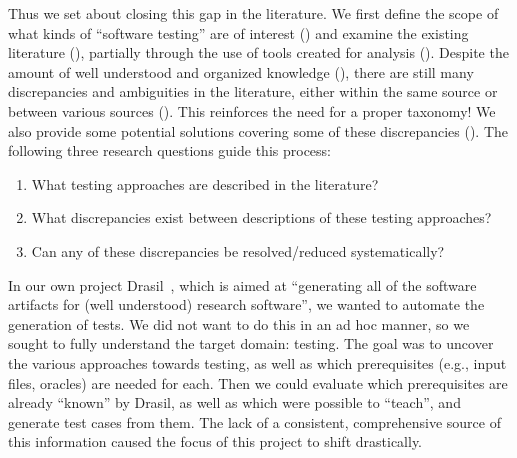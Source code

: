 Thus we set about closing this gap in the literature. We first define the scope
of what kinds of
``software testing'' are of interest () and examine the existing
literature ()\ifnotpaper, partially through the use of tools
created for analysis ()\fi. Despite the amount of well understood
and organized knowledge (), there are still many discrepancies and
ambiguities in the literature, either within the same source or between various
sources (). This reinforces the need for a proper taxonomy! We
also provide some potential solutions covering some of these discrepancies
().
\ifnotpaper
    The following three research questions guide this process:
    \begin{enumerate}
        \item What testing approaches are described in the literature?
        \item What discrepancies exist between descriptions of these testing
              approaches?
        \item Can any of these discrepancies be resolved/reduced systematically?
    \end{enumerate}

    In our own project Drasil~\citep{Drasil}, which is aimed at ``generating
    all of the software artifacts for (well understood) research software'', we
    wanted to automate the generation of tests. We did not want to do this
    in an ad hoc manner, so we sought to fully understand the target domain:
    testing. The goal was to uncover the various approaches towards testing, as
    well as which prerequisites (e.g., input files, oracles) are needed for
    each. Then we could evaluate which prerequisites are already ``known'' by
    Drasil, as well as which were possible to ``teach'', and generate test
    cases from them. The lack of a consistent, comprehensive source of this
    information caused the focus of this project to shift drastically.
\fi